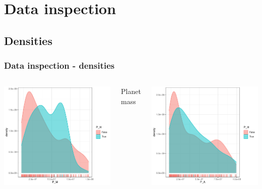 \documentclass[compress]{beamer}
\begin{document}
\section{Data inspection}
\subsection{Densities}
\begin{frame}
\frametitle{Data inspection - densities}
\begin{columns}[t]
        \includegraphics[width=\linewidth]{Pic/Density/P_M.pdf}
        \begin{center}
        Planet mass\\
        \end{center}
        \includegraphics[width=\linewidth]{Pic/Density/P_A.pdf}

\end{columns}
\end{frame}
\end{document}
